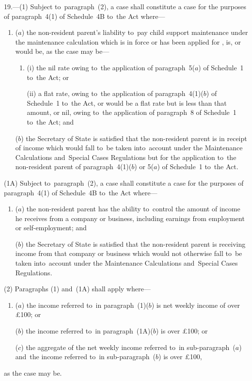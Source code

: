 \documentclass[12pt,a4paper]{article}
\begin{document}
19.---(1)  Subject to~paragraph~(2), a case shall constitute a case for the purposes of paragraph~4(1) of Schedule~4B to~the Act where—
\begin{enumerate}\item[]
($a$) the non-resident parent’s liability to~pay child support maintenance under the maintenance calculation which is in force or has been applied for%
, is, or would be, as the case may be—
\begin{enumerate}\item[]
(i) the nil rate owing to~the application of paragraph~5($a$)  of Schedule~1 to~the Act; or

(ii) a flat rate, owing to~the application of paragraph~4(1)($b$)  of Schedule~1 to~the Act, or would be a flat rate but is less than that amount, or nil, owing to~the application of paragraph~8 of Schedule~1 to~the Act; and
\end{enumerate}

($b$) the Secretary of State is satisfied that the non-resident parent is in receipt of income which would fall to~be taken into~account under the Maintenance Calculations and~Special Cases Regulations but for the application to~the non-resident parent of paragraph~4(1)($b$)  or 5($a$)  of Schedule~1 to~the Act.
\end{enumerate}

(1A) Subject to~paragraph~(2), a case shall constitute a case for the purposes of paragraph~4(1) of Schedule~4B to~the Act where—
\begin{enumerate}\item[]
($a$) the non-resident parent has the ability to~control the amount of income he receives from a company or business, including earnings from employment or self-employment; and

($b$) the Secretary of State is satisfied that the non-resident parent is receiving income from that company or business which would not otherwise fall to~be taken into~account under the Maintenance Calculations and~Special Cases Regulations.
\end{enumerate}


(2) Paragraphs (1) and~(1A) shall apply where—
\begin{enumerate}\item[]
($a$) the income referred to~in paragraph~(1)($b$)  is net weekly income of over £100; or

($b$) the income referred to~in paragraph~(1A)($b$)  is over £100; or

($c$) the aggregate of the net weekly income referred to~in sub-\hspace{0pt}paragraph~($a$)  and~the income referred to~in sub-paragraph~($b$)  is over £100,
\end{enumerate}
as the case may be.
\end{document}
